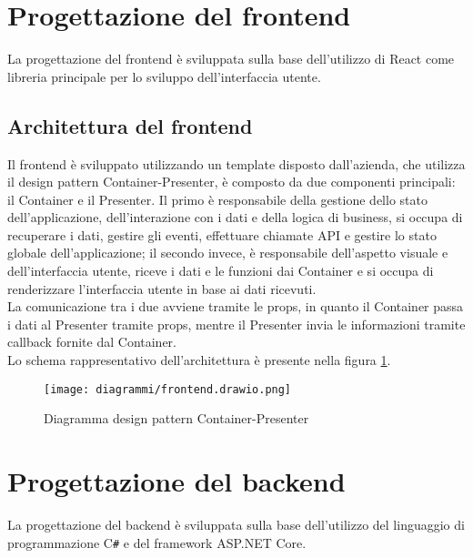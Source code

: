 \pagebreak

\section{Progettazione del frontend}
La progettazione del frontend è sviluppata sulla base dell'utilizzo di React come libreria principale per lo sviluppo dell'interfaccia utente.
\subsection{Architettura del frontend}
Il frontend è sviluppato utilizzando un template disposto dall'azienda, che utilizza il design pattern Container-Presenter, è composto da due componenti principali: il Container e il Presenter.
Il primo è responsabile della gestione dello stato dell'applicazione, dell'interazione con i dati e della logica di business, si occupa di recuperare i dati, gestire gli eventi, effettuare chiamate API e gestire lo stato globale dell'applicazione; il secondo invece, è responsabile dell'aspetto visuale e dell'interfaccia utente, riceve i dati e le funzioni dai Container e si occupa di renderizzare l'interfaccia utente in base ai dati ricevuti.\\
La comunicazione tra i due avviene tramite le props, in quanto il Container passa i dati al Presenter tramite props, mentre il Presenter invia le informazioni tramite callback fornite dal Container.\\
Lo schema rappresentativo dell'architettura è presente nella figura \ref{fig:Diagrammafrontend}.
\begin{figure}[!h] 
    \centering 
    \texttt{[image: diagrammi/frontend.drawio.png]} 
    \caption{Diagramma design pattern Container-Presenter}
    \label{fig:Diagrammafrontend}
\end{figure}
\clearpage
\section{Progettazione del backend}
La progettazione del backend è sviluppata sulla base dell'utilizzo del linguaggio di programmazione C\texttt{\#} e del framework ASP.NET Core.\\
